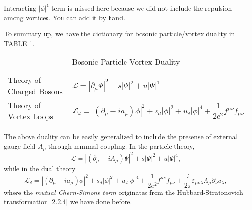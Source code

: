 \documentclass[10pt,nofootinbib]{revtex4}
\numberwithin{equation}{section}
\begin{document}
		Interacting $|\phi|^4$ term is missed here because we did not include the repulsion among vortices. You can add it by hand.\par
		To summary up, we have the dictionary for bosonic particle/vortex duality in TABLE \ref{tab:2}.\par
		\begin{table}[htp]
			\begin{tabular}{p{4cm}p{8cm}}
				Theory of Charged Bosons & $\mathcal{L}=|\partial_\mu\Psi|^2+s|\Psi|^2+u|\Psi|^4$ \\ 
				Theory of Vortex Loops & $\mathcal{L}_d=|(\partial_\mu-ia_\mu)\phi|^2+s_d|\phi|^2+u_d|\phi|^4+\dfrac{1}{2e^2}f^{\mu\nu}f_{\mu\nu}$ 
			\end{tabular}
			\caption{Bosonic Particle Vortex Duality}
			\label{tab:2}
		\end{table}
		The above duality can be easily generalized to include the presense of external gauge field $A_\mu$ through minimal coupling. In the particle theory,
		\begin{equation}\label{2.2.20}
			\mathcal{L}=|(\partial_\mu-iA_\mu)\Psi|^2+s|\Psi|^2+u|\Psi|^4,
		\end{equation}
		while in the dual theory
		\begin{equation}\label{2.2.21}
			\mathcal{L}_d=|(\partial_\mu-ia_\mu)\phi|^2+s_d|\phi|^2+u_d|\phi|^4+\dfrac{1}{2e^2}f^{\mu\nu}f_{\mu\nu}+\dfrac{i}{2\pi}\varepsilon_{\mu\nu\lambda}A_\mu \partial_\nu a_\lambda,
		\end{equation}
		where the \emph{mutual Chern-Simons term} originates from the Hubbard-Stratonovich transformation \eqref{2.2.4} we have done before. \par
		
\end{document}
